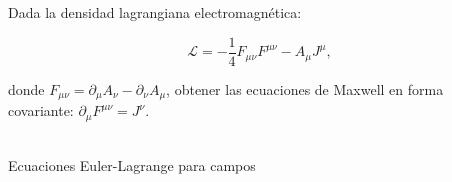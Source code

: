Dada la densidad lagrangiana electromagnética: 

$$
\mathcal{L}=-\frac{1}{4} F_{\mu \nu} F^{\mu \nu}-A_{\mu} J^{\mu},
$$

donde $F_{\mu \nu}=\partial_{\mu} A_{\nu}-\partial_{\nu} A_{\mu}$, obtener las ecuaciones de Maxwell en forma covariante: $\partial_{\mu} F^{\mu \nu}=J^{\nu}$.

\begin{solution}\ \\
Ecuaciones Euler-Lagrange para campos
\end{solution}